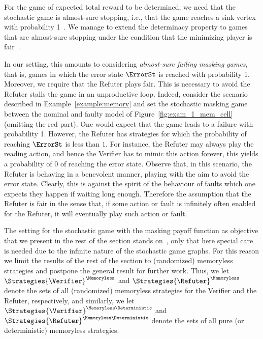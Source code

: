 


For the game of expected total reward to be determined, we need that
the stochastic game is almost-sure stopping, i.e., that the game
reaches a sink vertex with probability 1~\cite{FilarV96}. We manage to
extend the determinacy property to games that are almost-sure stopping
under the condition that the minimizing player is
fair~\cite{DBLP:journals/corr/abs-2112-09811}.

In our setting, this amounts to considering \emph{almost-sure failing
masking games}, that is, games in which the error state $\ErrorSt$ is
reached with probability 1.  Moreover, we require that the Refuter
plays fair.  This is necessary to avoid the Refuter stalls the game
in an unproductive loop.
%
Indeed, consider the scenario described in
Example~\ref{example:memory} and set the stochastic masking game
between the nominal and faulty model of
Figure~\ref{fig:exam_1_mem_cell} (omitting the red part).
One would expect that the game leads to a failure with probability 1.
%
However, the Refuter has strategies for which the probability of
reaching $\ErrorSt$ is less than $1$.  For instance, the Refuter may
always play the reading action, and hence the Verifier has to mimic
this action forever, this yields a probability of $0$ of reaching the
error state.
%
Observe that, in this scenario, the Refuter is behaving in a
benevolent manner, playing with the aim to avoid the error state.
Clearly, this is against the spirit of the behaviour of faults which
one expects they happen if waiting long enough.
%
Therefore the assumption that the Refuter is fair in the sense that,
if some action or fault is infinitely often enabled for the Refuter,
it will eventually play such action or fault.

The setting for the stochastic game with the masking payoff function
as objective that we present in the rest of the section stands
on~\cite{DBLP:journals/corr/abs-2112-09811}, only that here special
care is needed due to the infinite nature of the stochastic game
graphs.
%
For this reason we limit the results of the rest of the section to
(randomized) memoryless strategies and postpone the general result for
further work.
%
Thus, we let $\Strategies{\Verifier}^{\Memoryless}$ and
$\Strategies{\Refuter}^{\Memoryless}$ denote the sets of all
(randomized) memoryless strategies for the Verifier and the Refuter,
respectively, and similarly, we let
$\Strategies{\Verifier}^{\Memoryless\Deterministic}$ and
$\Strategies{\Refuter}^{\Memoryless\Deterministic}$ denote the sets of
all pure (or deterministic) memoryless strategies.


